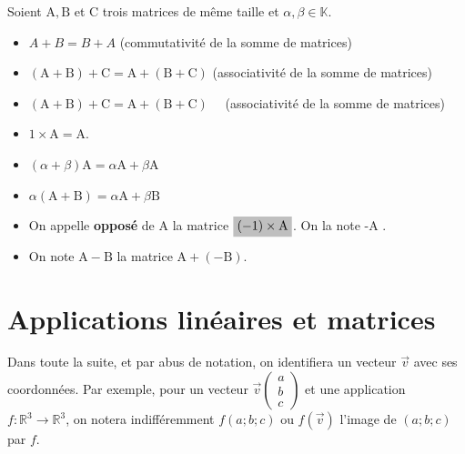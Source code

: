 \documentclass[12pt]{article}
\newcommand{\hideM}[1]{\mbox{\vphantom{$#1$}\smash{\colorbox{gray!50}{$\displaystyle #1$}}} }
\theoremstyle{break}
\begin{document}
\begin{proposition}{}{}
Soient $\mathrm{A}, \mathrm{B}$ et C trois matrices de même taille et $\alpha, \beta \in \mathbb{K}$.
\begin{itemize}[noitemsep,topsep=0pt]
  \item $A+B=B+A$ (commutativité de la somme de matrices)
  \item $(\mathrm{A}+\mathrm{B})+\mathrm{C}=\mathrm{A}+(\mathrm{B}+\mathrm{C})$ (associativité de la somme de matrices)
  \item $(\mathrm{A}+\mathrm{B})+\mathrm{C}=\mathrm{A}+(\mathrm{B}+\mathrm{C}) \quad$ (associativité de la somme de matrices)
  \item $1 \times \mathrm{A}=\mathrm{A}$.
  \item $(\alpha+\beta) \mathrm{A}=\alpha \mathrm{A}+\beta \mathrm{A}$
  \item $\alpha(\mathrm{A}+\mathrm{B})=\alpha \mathrm{A}+\beta \mathrm{B}$
\end{itemize}
\end{proposition}

\begin{definition}{}{}
\begin{itemize}[noitemsep,topsep=0pt]
  \item On appelle \textbf{opposé} de A la matrice $\hideM{(-1) \times \mathrm{A}}$. On la note -A .
  \item On note $\mathrm{A}-\mathrm{B}$ la matrice $\mathrm{A}+(-\mathrm{B})$.
\end{itemize}
\end{definition}

\newpage
\section{Applications linéaires et matrices}
Dans toute la suite, et par abus de notation, on identifiera un vecteur $\vec{v}$ avec ses coordonnées. Par exemple, pour un vecteur $\vec{v}\left(\begin{array}{l}a \\ b \\ c\end{array}\right)$ et une application $f: \mathbb{R}^{3} \longrightarrow \mathbb{R}^{3}$, on notera indifféremment $f(a ; b ; c)$ ou $f(\vec{v})$ l'image de $(a ; b ; c)$ par $f$.
\end{document}
